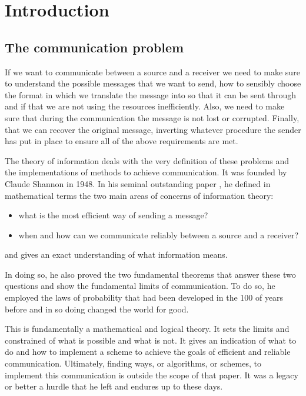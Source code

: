 
\chapter{Introduction}

\section{The communication problem} %

If we want to communicate between a source and a receiver we need to make sure to understand the possible messages that we want to send, how to sensibly choose the format in which we translate the message into so that it can be sent through and if that we are not using the resources inefficiently. Also, we need to make sure that during the communication the message is not lost or corrupted. Finally, that we can recover the original message, inverting whatever procedure the sender has put in place to ensure all of the above requirements are met.

The theory of information deals with the very definition of these problems and the implementations of methods to achieve communication. It was founded by Claude Shannon in 1948. In his seminal outstanding paper \cite{shannon}, he defined in mathematical terms the two main areas of concerns of information theory:
\begin{itemize}
	\item what is the most efficient way of sending a message?
	\item when and how can we communicate reliably between a source and a receiver?
\end{itemize}
and gives an exact understanding of what information means.

In doing so, he also proved the two fundamental theorems that answer these two questions and show the fundamental limits of communication.  To do so, he employed the laws of probability that had been developed in the 100 of years before and in so doing changed the world for good.

This is fundamentally a mathematical and logical theory. It sets the limits and constrained of what is possible and what is not. It gives an indication of what to do and how to implement a scheme to achieve the goals of efficient and reliable  communication. Ultimately, finding ways, or algorithms, or schemes, to implement this communication is outside the scope of that paper. It was a legacy or better a hurdle that he left and endures up to these days.


